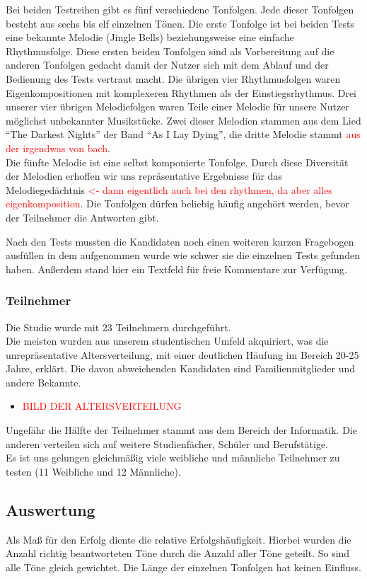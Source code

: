 \documentclass{acm_proc_article-sp}
\begin{document}
Bei beiden Testreihen gibt es fünf verschiedene Tonfolgen. Jede dieser Tonfolgen besteht aus sechs bis elf einzelnen Tönen. Die erste Tonfolge ist bei beiden Tests eine bekannte Melodie (Jingle Bells) beziehungsweise eine einfache Rhythmusfolge. Diese ersten beiden Tonfolgen sind als Vorbereitung auf die anderen Tonfolgen gedacht damit der Nutzer sich mit dem Ablauf und der Bedienung des Tests vertraut macht.
Die übrigen vier Rhythmusfolgen waren Eigenkompositionen mit komplexeren Rhythmen als der Einstiegsrhythmus.
Drei unserer vier übrigen Melodiefolgen waren Teile einer Melodie für unsere Nutzer möglichst unbekannter Musikstücke.
Zwei dieser Melodien stammen aus dem Lied "`The Darkest Nights"' der Band "`As I Lay Dying"', die dritte Melodie stammt \textcolor{red}{aus der irgendwas von bach}.\\
Die fünfte Melodie ist eine selbst komponierte Tonfolge. Durch diese Diversität der Melodien erhoffen wir uns repräsentative Ergebnisse für das Melodiegedächtnis \textcolor{red}{<- dann eigentlich auch bei den rhythmen, da aber alles eigenkomposition}. Die Tonfolgen dürfen beliebig häufig angehört werden, bevor der Teilnehmer die Antworten gibt.
 
Nach den Tests mussten die Kandidaten noch einen weiteren kurzen Fragebogen ausfüllen in dem aufgenommen wurde wie schwer sie die einzelnen Tests gefunden haben. Außerdem stand hier ein Textfeld für freie Kommentare zur Verfügung. 

\subsubsection{Teilnehmer}
Die Studie wurde mit 23 Teilnehmern durchgeführt.\\
Die meisten wurden aus unserem studentischen Umfeld akquiriert, was die unrepräsentative Altersverteilung, mit einer deutlichen Häufung im Bereich 20-25 Jahre, erklärt. Die davon abweichenden Kandidaten sind Familienmitglieder und andere Bekannte.
\begin{itemize} 
\item \textcolor{red}{BILD DER ALTERSVERTEILUNG}
\end{itemize}
Ungefähr die Hälfte der Teilnehmer stammt aus dem Bereich der Informatik. Die anderen verteilen sich auf weitere Studienfächer, Schüler und Berufstätige.\\
Es ist uns gelungen gleichmäßig viele weibliche und männliche Teilnehmer zu testen (11 Weibliche und 12 Männliche). 
\subsection{Auswertung}
Als Maß für den Erfolg diente die relative Erfolgshäufigkeit. Hierbei wurden die Anzahl richtig beantworteten Töne durch die Anzahl aller Töne geteilt. So sind alle Töne gleich gewichtet. Die Länge der einzelnen Tonfolgen hat keinen Einfluss.
\end{document}
